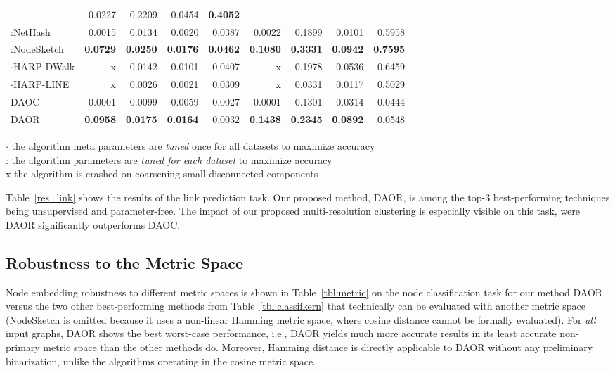 \documentclass[conference]{IEEEtran}
\newcommand{\sys}{DAOR\xspace}
\begin{document}
\begin{table*}[htbp]
\begin{tabular}{l|rrrr|rrrr}
& 0.0227 & 0.2209 & 0.0454 & \textbf{0.4052}           
\\ 
:NetHash                  & 0.0015          & 0.0134          & 0.0020          & 0.0387                    
& 0.0022          & 0.1899          & 0.0101          & 0.5958                    
\\
:NodeSketch               & \textbf{0.0729} & \textbf{0.0250} & \textbf{0.0176} & \textbf{0.0462}           
& \textbf{0.1080} & \textbf{0.3331} & \textbf{0.0942} & \textbf{0.7595}           
\\ \hline
$\cdot$HARP-DWalk               & x & 0.0142 & 0.0101         & 0.0407 
& x & 0.1978 & 0.0536          & 0.6459 
\\
$\cdot$HARP-LINE               & x & 0.0026 & 0.0021 & 0.0309         
& x & 0.0331 & 0.0117          & 0.5029 
\\ \hline
DAOC               & 0.0001 & 0.0099 & 0.0059         & 0.0027 
& 0.0001 & 0.1301 & 0.0314          & 0.0444 
\\
DAOR               & \textbf{0.0958}  &  \textbf{0.0175}  & \textbf{0.0164}  & 0.0032            
& \textbf{0.1438}  & \textbf{0.2345}  & \textbf{0.0892}  & 0.0548          
\\ \hline
\end{tabular}
\begin{flushleft}
\center
\footnotesize{
$\cdot$  the algorithm meta parameters are \emph{tuned} once for all datasets to maximize accuracy\\
:  the algorithm parameters are \emph{tuned for each dataset} to maximize accuracy\\
x  the algorithm is crashed on coarsening small disconnected components
}
\end{flushleft}
\vspace{-4pt}
\end{table*}
Table~\ref{res_link} shows the results of the link prediction task. Our proposed method, \sys, is among the top-3 best-performing techniques being unsupervised and parameter-free. The impact of our proposed multi-resolution clustering is especially visible on this task, were \sys significantly outperforms DAOC. 


\subsection{Robustness to the Metric Space}

Node embedding robustness to different metric spaces is shown in Table~\ref{tbl:metric} on the node classification task for our method \sys versus the two other best-performing methods from Table~\ref{tbl:classifkern} that technically can be evaluated with another metric space (NodeSketch is omitted because it uses a non-linear Hamming metric space, where cosine distance cannot be formally evaluated). For \emph{all} input graphs, \sys shows the best worst-case performance, i.e.,  \sys yields much more accurate results in its least accurate non-primary metric space than the other methods do. Moreover, Hamming distance is directly applicable to \sys without any preliminary binarization, unlike the algorithms operating in the cosine metric space.
\end{document}
